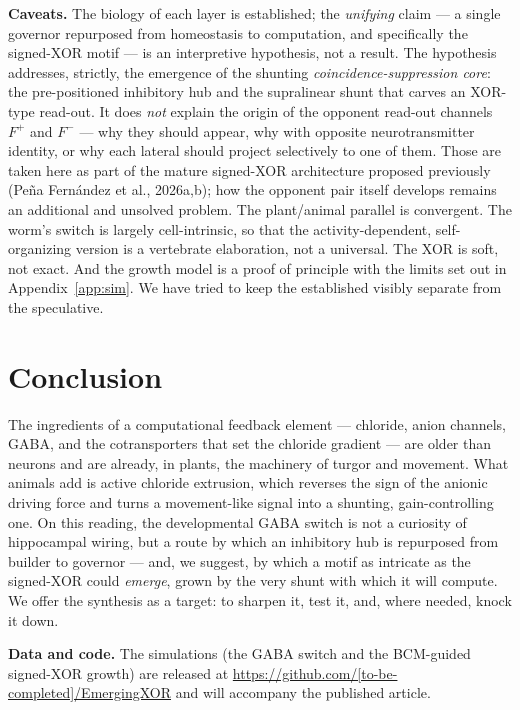 \documentclass[11pt,a4paper]{article}
\begin{document}
\textbf{Caveats.} The biology of each layer is established; the \emph{unifying} claim --- a single governor repurposed from homeostasis to computation, and specifically the signed-XOR motif --- is an interpretive hypothesis, not a result. The hypothesis addresses, strictly, the emergence of the shunting \emph{coincidence-suppression core}: the pre-positioned inhibitory hub and the supralinear shunt that carves an XOR-type read-out. It does \emph{not} explain the origin of the opponent read-out channels $F^{+}$ and $F^{-}$ --- why they should appear, why with opposite neurotransmitter identity, or why each lateral should project selectively to one of them. Those are taken here as part of the mature signed-XOR architecture proposed previously (Pe\~na Fern\'andez et al., 2026a,b); how the opponent pair itself develops remains an additional and unsolved problem. The plant/animal parallel is convergent. The worm's switch is largely cell-intrinsic, so that the activity-dependent, self-organizing version is a vertebrate elaboration, not a universal. The XOR is soft, not exact. And the growth model is a proof of principle with the limits set out in Appendix~\ref{app:sim}. We have tried to keep the established visibly separate from the speculative.

\section{Conclusion}\label{sec:concl}
The ingredients of a computational feedback element --- chloride, anion channels, GABA, and the cotransporters that set the chloride gradient --- are older than neurons and are already, in plants, the machinery of turgor and movement. What animals add is active chloride extrusion, which reverses the sign of the anionic driving force and turns a movement-like signal into a shunting, gain-controlling one. On this reading, the developmental GABA switch is not a curiosity of hippocampal wiring, but a route by which an inhibitory hub is repurposed from builder to governor --- and, we suggest, by which a motif as intricate as the signed-XOR could \emph{emerge}, grown by the very shunt with which it will compute. We offer the synthesis as a target: to sharpen it, test it, and, where needed, knock it down.

\vspace{0.4em}
\noindent\textbf{Data and code.} The simulations (the GABA switch and the BCM-guided signed-XOR growth) are released at \url{https://github.com/[to-be-completed]/EmergingXOR} and will accompany the published article.
\end{document}

